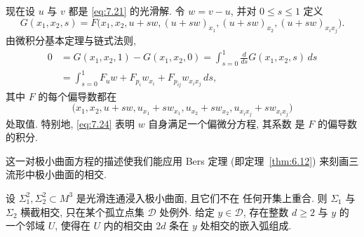 现在设 $u$ 与 $v$ 都是 \eqref{eq:7.21} 的光滑解. 令 $w=v-u$, 并对
$0\leq s\leq1$ 定义
\begin{equation}
G(x_1,x_2,s)=F\bigl(x_1,x_2,u+sw,(u+sw)_{x_1},(u+sw)_{x_2},
(u+sw)_{x_ix_j}\bigr).
\label{eq:7.23}
\end{equation}
由微积分基本定理与链式法则,
\begin{equation}
\begin{aligned}
0&=G(x_1,x_2,1)-G(x_1,x_2,0)
=\int_{s=0}^1\frac{d}{ds}G(x_1,x_2,s)\,ds\\
&=\int_{s=0}^1F_uw+F_{p_i}w_{x_i}+F_{p_{ij}}w_{x_ix_j}\,ds,
\end{aligned}
\label{eq:7.24}
\end{equation}
其中 $F$ 的每个偏导数都在
\begin{equation}
\bigl(x_1,x_2,u+sw,u_{x_1}+sw_{x_1},u_{x_2}+sw_{x_2},
u_{x_ix_j}+sw_{x_ix_j}\bigr)
\label{eq:7.25}
\end{equation}
处取值. 特别地, \eqref{eq:7.24} 表明 $w$ 自身满足一个偏微分方程, 其系数
是 $F$ 的偏导数的积分.

这一对极小曲面方程的描述使我们能应用 Bers 定理 (即定理~\ref{thm:6.12}) 来刻画三
流形中极小曲面的相交.

\begin{theorem}[极小曲面相交的局部描述]
\label{thm:7.3}
设 $\Sigma_1^2,\Sigma_2^2\subset M^3$ 是光滑连通浸入极小曲面, 且它们不在
任何开集上重合. 则 $\Sigma_1$ 与 $\Sigma_2$ 横截相交, 只在某个孤立点集
$\mathcal{D}$ 处例外. 给定 $y\in\mathcal{D}$, 存在整数 $d\geq2$ 与 $y$ 的
一个邻域 $U$, 使得在 $U$ 内的相交由 $2d$ 条在 $y$ 处相交的嵌入弧组成.
\end{theorem}


